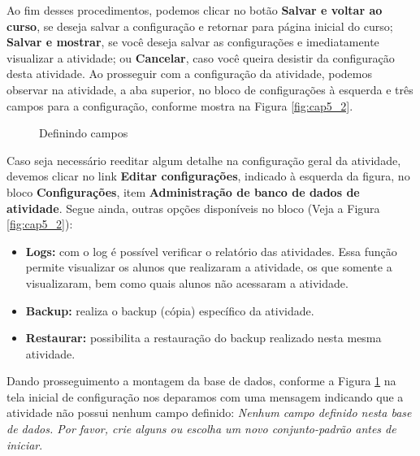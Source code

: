 Ao fim desses procedimentos, podemos clicar no botão \textbf{Salvar e voltar ao curso}, se deseja salvar a configuração e retornar para página inicial do curso; \textbf{Salvar e mostrar}, se você deseja salvar as configurações e imediatamente visualizar a atividade; ou \textbf{Cancelar}, caso você queira desistir da configuração desta atividade. Ao prosseguir com a configuração da atividade, podemos observar na atividade, a aba superior, no bloco de configurações à esquerda e três campos para a configuração, conforme mostra na Figura \ref{fig:cap5_2}.

\begin{figure}[htbp]
 \begin{center}
  \caption{Definindo campos}
  \label{fig:cap5_3}
 \end{center}
\end{figure}

Caso seja necessário reeditar algum detalhe na configuração geral da atividade, devemos clicar no link \textbf{Editar configurações}, indicado à esquerda da figura, no bloco \textbf{Configurações}, item \textbf{Administração de banco de dados de atividade}. Segue ainda, outras opções disponíveis no bloco (Veja a Figura \ref{fig:cap5_2}):

\begin{itemize}
 \item \textbf{Logs:} com o log é possível verificar o relatório das atividades. Essa função permite visualizar os alunos que realizaram a atividade, os que somente a visualizaram, bem como quais alunos não acessaram a atividade.
 \item \textbf{Backup:} realiza o backup (cópia) específico da atividade.
 \item \textbf{Restaurar:} possibilita a restauração do backup realizado nesta mesma atividade.
\end{itemize}

Dando prosseguimento a montagem da base de dados, conforme a Figura \ref{fig:cap5_3} na tela inicial de configuração nos deparamos com uma mensagem indicando que a atividade não possui nenhum campo definido: \textit{Nenhum campo definido nesta base de dados. Por favor, crie alguns ou escolha um novo conjunto-padrão antes de iniciar}.

